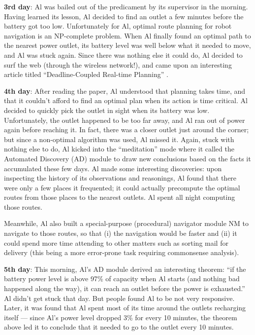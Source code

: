\documentclass{llncs}
\begin{document}
\noindent \textbf{3rd day}: Al was bailed out of the predicament by
its supervisor in the morning.  Having learned its lesson, Al decided to
find an outlet a few minutes before the battery got too low.  Unfortunately
for Al, optimal route planning for robot navigation is an NP-complete
problem.  When Al finally found an optimal path to the nearest power
outlet, its battery level was well below what it needed to move, and Al was
stuck again.  Since there was nothing else it could do, Al decided to surf
the web (through the wireless network!), and came upon an interesting
article titled {}``Deadline-Coupled Real-time Planning''
\cite{nirkhe/kraus/miller/perlis:how}.

\noindent \textbf{4th day}: After reading the paper, Al understood
that planning takes time, and that it couldn't afford to find an optimal
plan when its action is time critical.  Al decided to quickly pick the
outlet in sight when its battery was low.  Unfortunately, the outlet
happened to be too far away, and Al ran out of power again before reaching
it.  In fact, there was a closer outlet just around the corner; but since a
non-optimal algorithm was used, Al missed it.  Again, stuck with nothing
else to do, Al kicked into the {}``meditation'' mode where it called the
Automated Discovery (AD) module to draw new conclusions based on the facts
it accumulated these few days.  Al made some interesting discoveries: upon
inspecting the history of its observations and reasonings, Al found that
there were only a few places it frequented; it could actually precompute
the optimal routes from those places to the nearest outlets.  Al spent all
night computing those routes.

Meanwhile, Al also built a special-purpose (procedural) navigator module NM
to navigate to those routes, so that (i) the navigation would be faster and
(ii) it could spend more time attending to other matters such as sorting
mail for delivery (this being a more error-prone task requiring commonsense
analysis).

\noindent \textbf{5th day}: This morning, Al's AD module derived an
interesting theorem: {}``if the battery power level is above 97\% of
capacity when Al starts (and nothing bad happened along the way), it can
reach an outlet before the power is exhausted.'' Al didn't get stuck that
day.  But people found Al to be not very responsive.  Later, it was found
that Al spent most of its time around the outlets recharging itself ---
since Al's power level dropped 3\% for every 10 minutes, the theorem above
led it to conclude that it needed to go to the outlet every 10 minutes.
\end{document}
